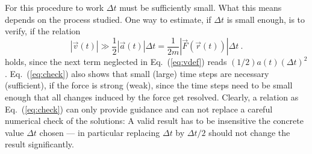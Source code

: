 \documentclass[12pt, UK english]{iopart}
\begin{document}
For this procedure to work $\Delta t$ must be sufficiently small.
What this means depends on the process studied.
One way to estimate, if $\Delta t$ is small enough, is to verify, if the relation
\begin{equation}
|\vec v(t)| \gg \frac12|\vec a(t)|\Delta t = \frac{1}{2m} |\vec F(\vec r(t)) |\Delta t\ . 
\label{eq:check}
\end{equation}
holds, since the next term neglected in Eq.~(\ref{eq:vdef}) reads $(1/2)a(t)(\Delta t)^2$.
Eq.~({\ref{eq:check}}) also shows that small (large) time steps are necessary (sufficient), if the force is strong (weak), since the time steps need to be small enough that all changes induced by the force get resolved.
Clearly, a relation as Eq.~({\ref{eq:check}}) can only provide guidance and can not replace a careful numerical check of the solutions: A valid result has to be insensitive the concrete value $\Delta t$ chosen --- in particular replacing $\Delta t$ by $\Delta t/2$ should not change the result significantly.



\end{document}

